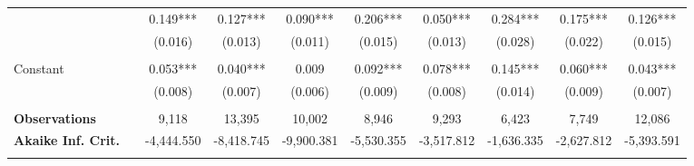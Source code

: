 \begin{tabular*}{\linewidth}{@{\extracolsep{\fill} } llcccccccc}
\hline%
\arrayrulecolor{white}%
\hline%
\arrayrulecolor{white}%
\hline%
\multirow{2}{*}{\hspace{0.2cm}500+}&&0.149***&0.127***&0.090***&0.206***&0.050***&0.284***&0.175***&0.126***\\%
&&(0.016)&(0.013)&(0.011)&(0.015)&(0.013)&(0.028)&(0.022)&(0.015)\\%
\arrayrulecolor{white}%
\hline%
\arrayrulecolor{white}%
\hline%
\arrayrulecolor{white}%
\hline%
\arrayrulecolor{white}%
\hline%
\arrayrulecolor{white}%
\hline%
&&&&&&&&&\\%
\multirow{2}{*}{Constant}&&0.053***&0.040***&0.009&0.092***&0.078***&0.145***&0.060***&0.043***\\%
&&(0.008)&(0.007)&(0.006)&(0.009)&(0.008)&(0.014)&(0.009)&(0.007)\\%
\arrayrulecolor{white}%
\hline%
\arrayrulecolor{white}%
\hline%
\arrayrulecolor{white}%
\hline%
\arrayrulecolor{white}%
\hline%
\arrayrulecolor{white}%
\hline%
&&&&&&&&&\\%
\bfseries Observations&&9,118&13,395&10,002&8,946&9,293&6,423&7,749&12,086\\%
\bfseries Akaike Inf. Crit.&&{-}4,444.550&{-}8,418.745&{-}9,900.381&{-}5,530.355&{-}3,517.812&{-}1,636.335&{-}2,627.812&{-}5,393.591\\%
\arrayrulecolor{white}%
\hline%
\arrayrulecolor{white}%
\hline%
\arrayrulecolor{white}%
\hline%
\arrayrulecolor{white}%
\hline%
\arrayrulecolor{white}%
\hline%
\arrayrulecolor{black}%
\hline%
\end{tabular*}